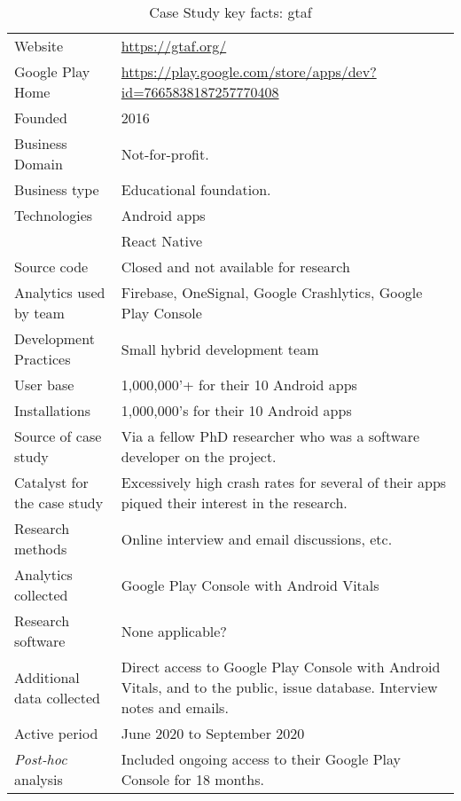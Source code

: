 {\renewcommand{\arraystretch}{0.8}%
\begin{table*}
    \centering
    \small
    \setlength{\tabcolsep}{6pt}
    \begin{tabular}{lp{11cm}}
       \toprule
       Website &\url{https://gtaf.org/} \\
       Google Play Home & \url{https://play.google.com/store/apps/dev?id=7665838187257770408} \\
       Founded & 2016 \\
       Business Domain & Not-for-profit.  \\
       Business type & Educational foundation. \\
       Technologies  & Android apps\footnotemark \\
       & React Native \\
       Source code  & Closed and not available for research \\
       Analytics used by team & Firebase, OneSignal, Google Crashlytics, Google Play Console \\
       Development Practices & Small hybrid development team \\
       \midrule
       User base & 1,000,000'+ for their 10 Android apps \\
       Installations & 1,000,000's for their 10 Android apps \\
       \midrule
       Source of case study &Via a fellow PhD researcher who was a software developer on the project. \\
       Catalyst for the case study &Excessively high crash rates for several of their apps piqued their interest in the research. \\
       \midrule
       Research methods &Online interview and email discussions, etc. \\
       Analytics collected &Google Play Console with Android Vitals \\
       Research software & None applicable? \\
       Additional data collected &Direct access to Google Play Console with Android Vitals, and to the public, issue database. Interview notes and emails. \\
       Active period & June 2020 to September 2020 \\
       \midrule
       \emph{Post-hoc} analysis &Included ongoing access to their Google Play Console for 18 months. \\
       \bottomrule
    \end{tabular}
    \caption{Case Study key facts: \acrshort{gtaf}}
    \label{tab:gtaf_anaytics_overview}
\end{table*}
}

